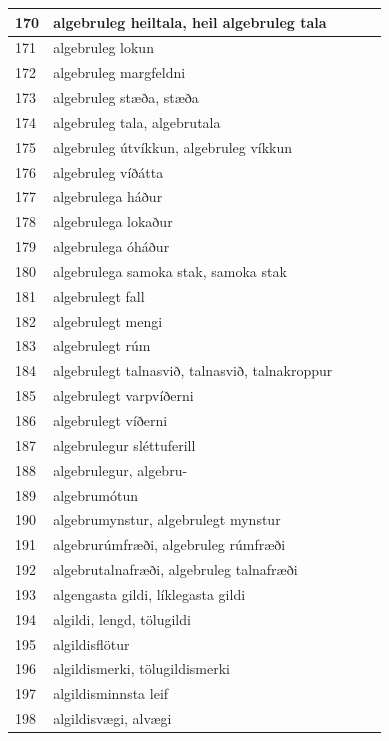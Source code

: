 \begin{longtable}{p{}|p{}|p{}|p{}|p{}}
\hline
170 & algebruleg heiltala, heil algebruleg tala &  &  &  \\
\hline
171 & algebruleg lokun &  &  &  \\
\hline
172 & algebruleg margfeldni &  &  &  \\
\hline
173 & algebruleg stæða, stæða &  &  &  \\
\hline
174 & algebruleg tala, algebrutala &  &  &  \\
\hline
175 & algebruleg útvíkkun, algebruleg víkkun &  &  &  \\
\hline
176 & algebruleg víðátta &  &  &  \\
\hline
177 & algebrulega háður &  &  &  \\
\hline
178 & algebrulega lokaður &  &  &  \\
\hline
179 & algebrulega óháður &  &  &  \\
\hline
180 & algebrulega samoka stak, samoka stak &  &  &  \\
\hline
181 & algebrulegt fall &  &  &  \\
\hline
182 & algebrulegt mengi &  &  &  \\
\hline
183 & algebrulegt rúm &  &  &  \\
\hline
184 & algebrulegt talnasvið, talnasvið, talnakroppur &  &  &  \\
\hline
185 & algebrulegt varpvíðerni &  &  &  \\
\hline
186 & algebrulegt víðerni &  &  &  \\
\hline
187 & algebrulegur sléttuferill &  &  &  \\
\hline
188 & algebrulegur, algebru- &  &  &  \\
\hline
189 & algebrumótun &  &  &  \\
\hline
190 & algebrumynstur, algebrulegt mynstur &  &  &  \\
\hline
191 & algebrurúmfræði, algebruleg rúmfræði &  &  &  \\
\hline
192 & algebrutalnafræði, algebruleg talnafræði &  &  &  \\
\hline
193 & algengasta gildi, líklegasta gildi &  &  &  \\
\hline
194 & algildi, lengd, tölugildi &  &  &  \\
\hline
195 & algildisflötur &  &  &  \\
\hline
196 & algildismerki, tölugildismerki &  &  &  \\
\hline
197 & algildisminnsta leif &  &  &  \\
\hline
198 & algildisvægi, alvægi &  &  &  \\

\end{longtable}

